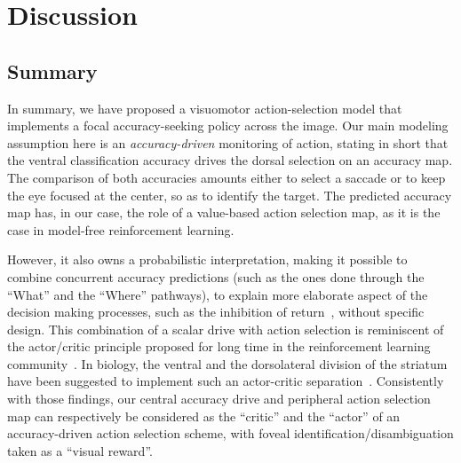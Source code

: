 \section{Discussion} \label{sec:discussion}
\subsection{Summary}

In summary, we have proposed a visuomotor action-selection model that implements a focal accuracy-seeking policy across the image. Our main modeling assumption here is an \emph{accuracy-driven} monitoring of action, stating in short that the ventral classification accuracy drives the dorsal selection on an accuracy map. The comparison of both accuracies amounts either to select a saccade or to keep the eye focused at the center, so as to identify the target. The predicted accuracy map has, in our case, the role of a value-based action selection map, as it is the case in model-free reinforcement learning.

However, it also owns a probabilistic interpretation, making it possible to combine concurrent accuracy predictions (such as the ones done through the ``What'' and the ``Where'' pathways), to explain more elaborate aspect of the decision making processes, such as the inhibition of return~\cite{Itti01}, without specific design. This combination of a scalar drive with action selection is reminiscent of the actor/critic principle proposed for long time in the reinforcement learning community~\cite{sutton1998reinforcement}. In biology, the ventral and the dorsolateral division of the striatum have been suggested to implement such an actor-critic separation~\cite{joel2002actor, takahashi2008silencing}. Consistently with those findings, our central accuracy drive and peripheral action selection map can respectively be considered as the ``critic'' and the ``actor'' of an accuracy-driven action selection scheme, with foveal identification/disambiguation taken as a ``visual reward''.

